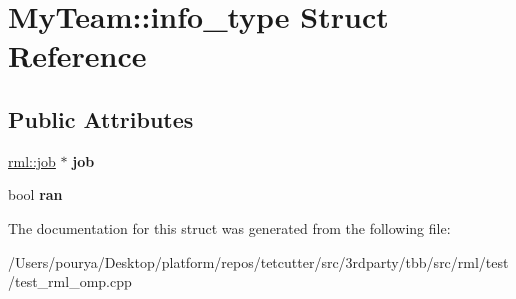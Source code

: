 \hypertarget{structMyTeam_1_1info__type}{}\section{My\+Team\+:\+:info\+\_\+type Struct Reference}
\label{structMyTeam_1_1info__type}
\subsection*{Public Attributes}
\begin{DoxyCompactItemize}
\item 
\hypertarget{structMyTeam_1_1info__type_af5f1b730862fba83ebbdb80539edde2b}{}\hyperlink{classrml_1_1job}{rml\+::job} $\ast$ {\bfseries job}\label{structMyTeam_1_1info__type_af5f1b730862fba83ebbdb80539edde2b}

\item 
\hypertarget{structMyTeam_1_1info__type_ae8997fff3f1a97f3bf51bf9ab9fc8051}{}bool {\bfseries ran}\label{structMyTeam_1_1info__type_ae8997fff3f1a97f3bf51bf9ab9fc8051}

\end{DoxyCompactItemize}


The documentation for this struct was generated from the following file\+:\begin{DoxyCompactItemize}
\item 
/\+Users/pourya/\+Desktop/platform/repos/tetcutter/src/3rdparty/tbb/src/rml/test/test\+\_\+rml\+\_\+omp.\+cpp\end{DoxyCompactItemize}

